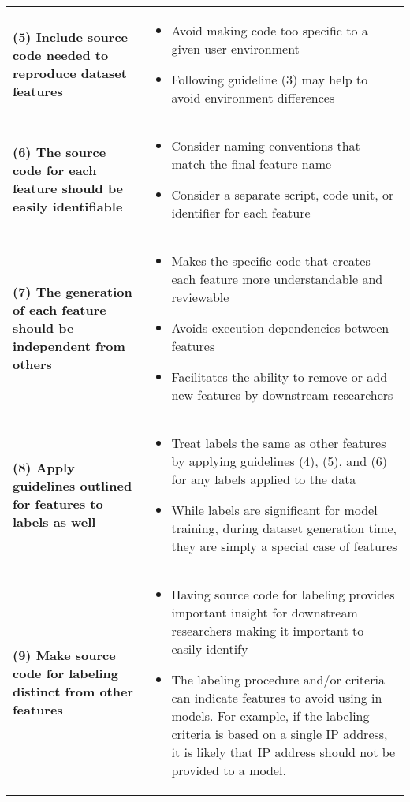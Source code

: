 \documentclass[sigconf, anonymous, screen, review]{acmart}
\begin{document}
\begin{table*}
\begin{tabular}{m{8cm} m{8cm}}
    \textbf{(5) Include source code needed to reproduce dataset features} &
    \begin{itemize}
        \item Avoid making code too specific to a given user environment
        \item Following guideline (3) may help to avoid environment differences
    \end{itemize} \\

    \textbf{(6) The source code for each feature should be easily identifiable} &
    \begin{itemize}
        \item Consider naming conventions that match the final  feature name
        \item Consider a separate script, code unit, or identifier for each feature
    \end{itemize} \\

    \textbf{(7) The generation of each feature should be independent from others} &
    \begin{itemize}
        \item Makes the specific code that creates each feature more understandable and reviewable
        \item Avoids execution dependencies between features
        \item Facilitates the ability to remove or add new features by downstream researchers
    \end{itemize} \\

    \textbf{(8) Apply guidelines outlined for features to labels as well} &
    \begin{itemize}
        \item Treat labels the same as other features by applying guidelines (4), (5), and (6) for any labels applied to the data
        \item While labels are significant for model training, during dataset generation time, they are simply a special case of features
    \end{itemize} \\

    \textbf{(9) Make source code for labeling distinct from other features} &
    \begin{itemize}
        \item Having source code for labeling provides important insight for downstream researchers making it important to easily identify
        \item The labeling procedure and/or criteria can indicate features to avoid using in models.
              For example, if the labeling criteria is based on a single IP address, it is likely that IP address should not be provided to a model.
    \end{itemize} \\


\end{tabular}
\end{table*}
\end{document}
